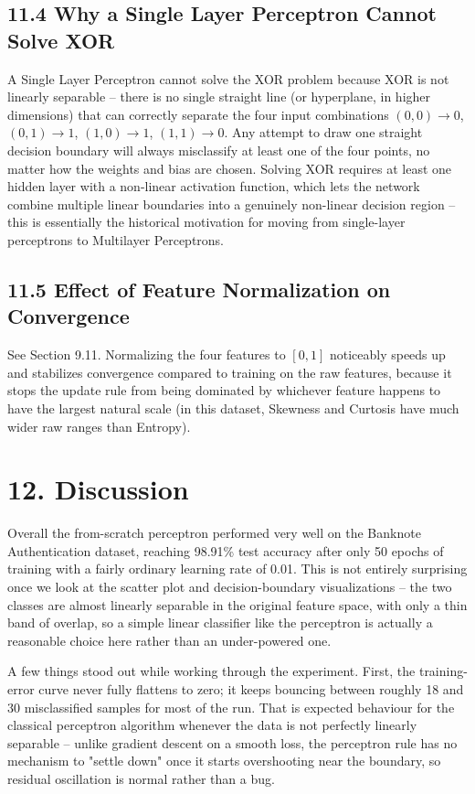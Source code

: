 \documentclass[11pt]{article}
\begin{document}
\subsection*{11.4 Why a Single Layer Perceptron Cannot Solve XOR}
A Single Layer Perceptron cannot solve the XOR problem because XOR is not linearly separable -- there is no single straight line (or hyperplane, in higher dimensions) that can correctly separate the four input combinations $(0,0)\to 0$, $(0,1)\to 1$, $(1,0)\to 1$, $(1,1)\to 0$. Any attempt to draw one straight decision boundary will always misclassify at least one of the four points, no matter how the weights and bias are chosen. Solving XOR requires at least one hidden layer with a non-linear activation function, which lets the network combine multiple linear boundaries into a genuinely non-linear decision region -- this is essentially the historical motivation for moving from single-layer perceptrons to Multilayer Perceptrons.

\subsection*{11.5 Effect of Feature Normalization on Convergence}
See Section 9.11. Normalizing the four features to $[0,1]$ noticeably speeds up and stabilizes convergence compared to training on the raw features, because it stops the update rule from being dominated by whichever feature happens to have the largest natural scale (in this dataset, Skewness and Curtosis have much wider raw ranges than Entropy).

\section*{12. Discussion}

Overall the from-scratch perceptron performed very well on the Banknote Authentication dataset, reaching 98.91\% test accuracy after only 50 epochs of training with a fairly ordinary learning rate of 0.01. This is not entirely surprising once we look at the scatter plot and decision-boundary visualizations -- the two classes are almost linearly separable in the original feature space, with only a thin band of overlap, so a simple linear classifier like the perceptron is actually a reasonable choice here rather than an under-powered one.

A few things stood out while working through the experiment. First, the training-error curve never fully flattens to zero; it keeps bouncing between roughly 18 and 30 misclassified samples for most of the run. That is expected behaviour for the classical perceptron algorithm whenever the data is not perfectly linearly separable -- unlike gradient descent on a smooth loss, the perceptron rule has no mechanism to "settle down" once it starts overshooting near the boundary, so residual oscillation is normal rather than a bug.
\end{document}
